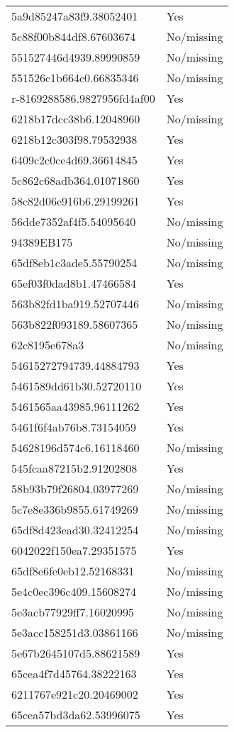 \begin{tabular}{ll}
5a9d85247a83f9.38052401 & Yes \\
5c88f00b844df8.67603674 & No/missing \\
551527446d4939.89990859 & No/missing \\
551526c1b664c0.66835346 & No/missing \\
r-8169288586.9827956fd4af00 & Yes \\
6218b17dcc38b6.12048960 & No/missing \\
6218b12c303f98.79532938 & Yes \\
6409c2c0ce4d69.36614845 & Yes \\
5c862c68adb364.01071860 & Yes \\
58c82d06e916b6.29199261 & Yes \\
56dde7352af4f5.54095640 & No/missing \\
94389EB175 & No/missing \\
65df8eb1c3ade5.55790254 & No/missing \\
65ef03f0dad8b1.47466584 & Yes \\
563b82fd1ba919.52707446 & No/missing \\
563b822f093189.58607365 & No/missing \\
62c8195e678a3 & No/missing \\
54615272794739.44884793 & Yes \\
5461589dd61b30.52720110 & Yes \\
5461565aa43985.96111262 & Yes \\
5461f6f4ab76b8.73154059 & Yes \\
54628196d574c6.16118460 & No/missing \\
545fcaa87215b2.91202808 & Yes \\
58b93b79f26804.03977269 & No/missing \\
5c7e8e336b9855.61749269 & No/missing \\
65df8d423ead30.32412254 & No/missing \\
6042022f150ea7.29351575 & Yes \\
65df8e6fe0eb12.52168331 & No/missing \\
5e4c0ec396c409.15608274 & No/missing \\
5e3acb77929ff7.16020995 & No/missing \\
5e3acc158251d3.03861166 & No/missing \\
5e67b2645107d5.88621589 & Yes \\
65cea4f7d45764.38222163 & Yes \\
6211767e921c20.20469002 & Yes \\
65cea57bd3da62.53996075 & Yes \\

\end{tabular}
